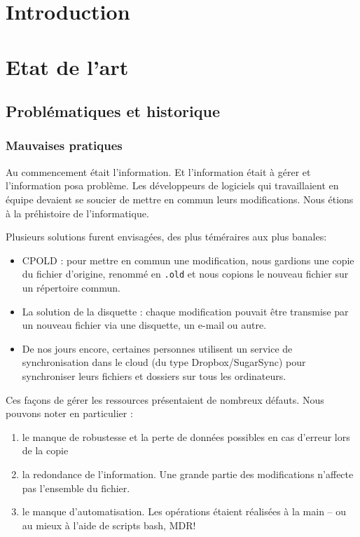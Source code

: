 
\section*{Introduction}

\section{Etat de l'art}

\subsection{Problématiques et historique}


\subsubsection{Mauvaises pratiques}

Au commencement était l'information. Et l'information était à gérer et l'information posa problème. Les développeurs de logiciels qui travaillaient en équipe devaient se soucier de mettre en commun leurs modifications. 
Nous étions à la préhistoire de l'informatique.

Plusieurs solutions furent envisagées, des plus téméraires aux plus banales:
\begin{itemize}
\item CPOLD : pour mettre en commun une modification, nous gardions une copie du fichier d'origine, renommé en \texttt{.old} et nous copions le nouveau fichier sur un répertoire commun. 
\item La solution de la disquette : chaque modification pouvait être transmise par un nouveau fichier via une disquette, un e-mail ou autre.
\item De nos jours encore, certaines personnes utilisent un service de synchronisation dans le cloud (du type Dropbox/SugarSync) pour synchroniser leurs fichiers et dossiers sur tous les ordinateurs. 
\end{itemize}

Ces façons de gérer les ressources présentaient de nombreux défauts. Nous pouvons noter en particulier : 
\begin{enumerate}
\item le manque de robustesse et la perte de données possibles en cas d'erreur lors de la copie
\item la redondance de l'information. Une grande partie des modifications n'affecte pas l'ensemble du fichier. 
\item le manque d'automatisation. Les opérations étaient réalisées à la main -- ou au mieux à l'aide de scripts bash, MDR! 
\end{enumerate}




